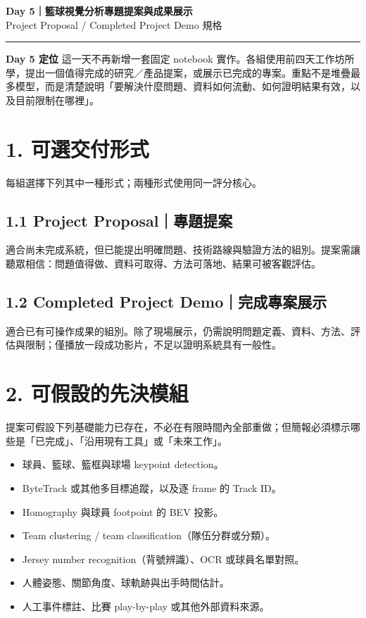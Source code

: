 \documentclass[11pt]{article}
\begin{document}
\begin{center}
  {\Huge\bfseries Day 5｜籃球視覺分析專題提案與成果展示}\\[5pt]
  {\Large Project Proposal / Completed Project Demo 規格}\\[8pt]
  \rule{0.92\textwidth}{0.6pt}
\end{center}

\begin{tcolorbox}[colback=Soft,colframe=Rule,arc=1mm,boxrule=0.5pt]
\textbf{Day 5 定位}\quad
這一天不再新增一套固定 notebook 實作。各組使用前四天工作坊所學，提出一個值得完成的研究／產品提案，或展示已完成的專案。重點不是堆疊最多模型，而是清楚說明「要解決什麼問題、資料如何流動、如何證明結果有效，以及目前限制在哪裡」。
\end{tcolorbox}

\section{1. 可選交付形式}

每組選擇下列其中一種形式；兩種形式使用同一評分核心。

\subsection{1.1 Project Proposal｜專題提案}

適合尚未完成系統，但已能提出明確問題、技術路線與驗證方法的組別。提案需讓聽眾相信：問題值得做、資料可取得、方法可落地、結果可被客觀評估。

\subsection{1.2 Completed Project Demo｜完成專案展示}

適合已有可操作成果的組別。除了現場展示，仍需說明問題定義、資料、方法、評估與限制；僅播放一段成功影片，不足以證明系統具有一般性。

\section{2. 可假設的先決模組}

提案可假設下列基礎能力已存在，不必在有限時間內全部重做；但簡報必須標示哪些是「已完成」、「沿用現有工具」或「未來工作」。

\begin{itemize}[leftmargin=1.6em,itemsep=3pt]
  \item 球員、籃球、籃框與球場 keypoint detection。
  \item ByteTrack 或其他多目標追蹤，以及逐 frame 的 Track ID。
  \item Homography 與球員 footpoint 的 BEV 投影。
  \item Team clustering / team classification（隊伍分群或分類）。
  \item Jersey number recognition（背號辨識）、OCR 或球員名單對照。
  \item 人體姿態、關節角度、球軌跡與出手時間估計。
  \item 人工事件標註、比賽 play-by-play 或其他外部資料來源。
\end{itemize}
\end{document}
